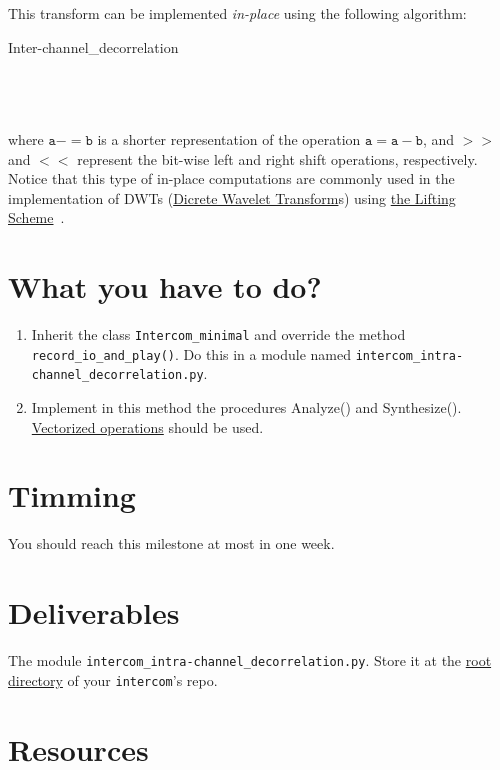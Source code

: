This transform can be implemented \emph{in-place} using the following
algorithm:

\begin{pseudocode}{Inter-channel\_decorrelation}{~}
  \BEGIN
     \\
     \\
  \END
  \ENDPROCEDURE
  \BEGIN
     \\
     \\
  \END
  \ENDPROCEDURE
\end{pseudocode}

where $\mathtt{a -= b}$ is a shorter representation of the operation
$\mathtt{a = a - b}$, and $\mathtt{>>}$ and $\mathtt{<<}$ represent
the bit-wise left and right shift operations, respectively. Notice
that this type of in-place computations are commonly used in the
implementation of DWTs
(\href{https://en.wikipedia.org/wiki/Discrete_wavelet_transform}{Dicrete
  Wavelet Transform}s) using
\href{https://cm-bell-labs.github.io/who/wim/papers/athome/athome.pdf}{the
  Lifting Scheme}~\cite{2006.sweldens}.

\section{What you have to do?}

\begin{enumerate}
\item Inherit the class \texttt{Intercom\_minimal} and override the
  method \texttt{record\_io\_and\_play()}. Do this in a module named
  \texttt{intercom\_intra-channel\_decorrelation.py}.
\item Implement in this method the procedures Analyze() and
  Synthesize(). \href{https://www.oreilly.com/library/view/python-for-data/9781449323592/ch04.html}{Vectorized
    operations} should be used.
\end{enumerate}

\section{Timming}

You should reach this milestone at most in one week.

\section{Deliverables}

The module \texttt{intercom\_intra-channel\_decorrelation.py}. Store
it at the
\href{https://github.com/Tecnologias-multimedia/intercom}{root
  directory} of your \texttt{intercom}'s repo.

\section{Resources}


